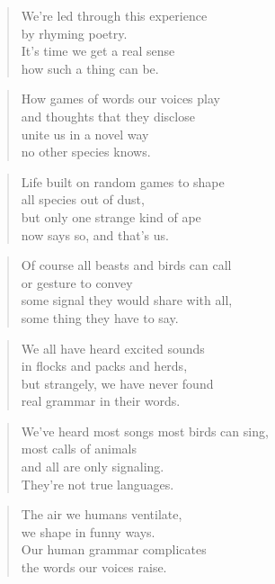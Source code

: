 \documentclass[10pt,a4paper]{article}
\begin{document}
\begin{paracol}{2}


\begin{verse}
We’re led through this experience\\
by rhyming poetry.\\
It’s time we get a real sense\\
how such a thing can be.
\end{verse}

\begin{verse}
How games of words our voices play\\
and thoughts that they disclose\\
unite us in a novel way\\
no other species knows.
\end{verse}

\begin{verse}
Life built on random games to shape\\
all species out of dust,\\
but only one strange kind of ape\\
now says so, and that’s us.
\end{verse}

\begin{verse}
Of course all beasts and birds can call\\
or gesture to convey\\
some signal they would share with all,\\
some thing they have to say.
\end{verse}

\begin{verse}
We all have heard excited sounds\\
in flocks and packs and herds,\\
but strangely, we have never found\\
real grammar in their words.
\end{verse}

\begin{verse}
We’ve heard most songs most birds can sing,\\
most calls of animals\\
and all are only signaling.\\
They’re not true languages.
\end{verse}

\begin{verse}
The air we humans ventilate,\\
we shape in funny ways.\\
Our human grammar complicates\\
the words our voices raise.
\end{verse}


\end{paracol}
\end{document}
